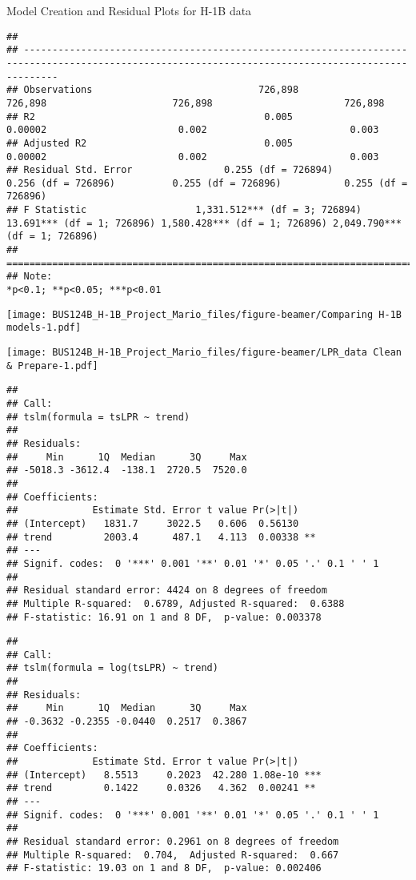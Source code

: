 \documentclass[
  ignorenonframetext,
]{beamer}
\begin{document}
\begin{frame}[fragile]{Model Creation and Residual Plots for H-1B data}
\begin{verbatim}
##                                                                                                                                                   
## --------------------------------------------------------------------------------------------------------------------------------------------------
## Observations                             726,898                     726,898                      726,898                       726,898           
## R2                                        0.005                      0.00002                       0.002                         0.003            
## Adjusted R2                               0.005                      0.00002                       0.002                         0.003            
## Residual Std. Error                0.255 (df = 726894)         0.256 (df = 726896)          0.255 (df = 726896)           0.255 (df = 726896)     
## F Statistic                   1,331.512*** (df = 3; 726894) 13.691*** (df = 1; 726896) 1,580.428*** (df = 1; 726896) 2,049.790*** (df = 1; 726896)
## ==================================================================================================================================================
## Note:                                                                                                                  *p<0.1; **p<0.05; ***p<0.01
\end{verbatim}

\texttt{[image: BUS124B\_H-1B\_Project\_Mario\_files/figure-beamer/Comparing H-1B models-1.pdf]}

\texttt{[image: BUS124B\_H-1B\_Project\_Mario\_files/figure-beamer/LPR\_data Clean \& Prepare-1.pdf]}

\begin{verbatim}
## 
## Call:
## tslm(formula = tsLPR ~ trend)
## 
## Residuals:
##     Min      1Q  Median      3Q     Max 
## -5018.3 -3612.4  -138.1  2720.5  7520.0 
## 
## Coefficients:
##             Estimate Std. Error t value Pr(>|t|)   
## (Intercept)   1831.7     3022.5   0.606  0.56130   
## trend         2003.4      487.1   4.113  0.00338 **
## ---
## Signif. codes:  0 '***' 0.001 '**' 0.01 '*' 0.05 '.' 0.1 ' ' 1
## 
## Residual standard error: 4424 on 8 degrees of freedom
## Multiple R-squared:  0.6789, Adjusted R-squared:  0.6388 
## F-statistic: 16.91 on 1 and 8 DF,  p-value: 0.003378
\end{verbatim}

\begin{verbatim}
## 
## Call:
## tslm(formula = log(tsLPR) ~ trend)
## 
## Residuals:
##     Min      1Q  Median      3Q     Max 
## -0.3632 -0.2355 -0.0440  0.2517  0.3867 
## 
## Coefficients:
##             Estimate Std. Error t value Pr(>|t|)    
## (Intercept)   8.5513     0.2023  42.280 1.08e-10 ***
## trend         0.1422     0.0326   4.362  0.00241 ** 
## ---
## Signif. codes:  0 '***' 0.001 '**' 0.01 '*' 0.05 '.' 0.1 ' ' 1
## 
## Residual standard error: 0.2961 on 8 degrees of freedom
## Multiple R-squared:  0.704,  Adjusted R-squared:  0.667 
## F-statistic: 19.03 on 1 and 8 DF,  p-value: 0.002406
\end{verbatim}


\end{frame}
\end{document}
